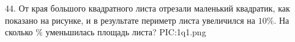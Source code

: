 44. От края большого квадратного листа отрезали маленький квадратик, как показано на рисунке, и в результате периметр листа увеличился на $10\%.$ На сколько $\%$ уменьшилась площадь листа?
{{PIC:1q1.png}}\\
